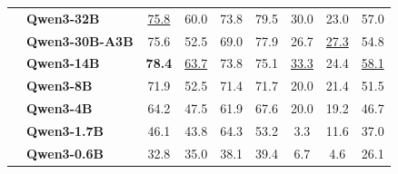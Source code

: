 \begin{table}[tbp]
{\begin{tabular}{clccccccc}
 & \textbf{Qwen3-32B} & \underline{75.8} & 60.0 & 73.8 & 79.5 & 30.0 & 23.0 & 57.0 \\
 & \textbf{Qwen3-30B-A3B} & 75.6 & 52.5 & 69.0 & 77.9 & 26.7 & \underline{27.3} & 54.8 \\
 & \textbf{Qwen3-14B} & \textbf{78.4} & \underline{63.7} & 73.8 & 75.1 & \underline{33.3} & 24.4 & \underline{58.1} \\
 & \textbf{Qwen3-8B} & 71.9 & 52.5 & 71.4 & 71.7 & 20.0 & 21.4 & 51.5 \\
 & \textbf{Qwen3-4B} & 64.2 & 47.5 & 61.9 & 67.6 & 20.0 & 19.2 & 46.7 \\
 & \textbf{Qwen3-1.7B} & 46.1 & 43.8 & 64.3 & 53.2 & 3.3 & 11.6 & 37.0 \\
 & \textbf{Qwen3-0.6B} & 32.8 & 35.0 & 38.1 & 39.4 & 6.7 & 4.6 & 26.1 \\
\bottomrule
\end{tabular}
}
\end{table}

